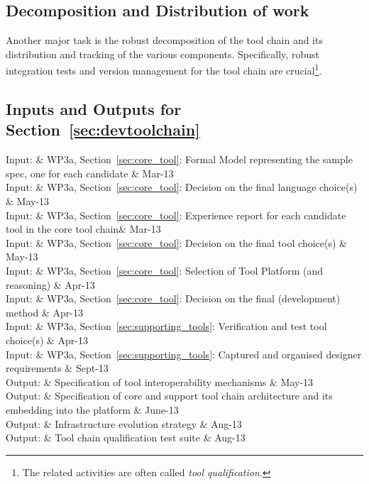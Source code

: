 \documentclass{template/openetcs_article}
\begin{document}
\subsection{Decomposition and Distribution of work}

Another major task is the robust decomposition of the tool chain and its 
distribution and tracking of the various components.  
Specifically, robust integration tests and version management for the tool chain are crucial\footnote{The related activities are often called {\it tool qualification}.}.



\subsection{Inputs and Outputs for Section~\ref{sec:devtoolchain}}


\begin{inoutput}
Input: & WP3a, Section~\ref{sec:core_tool}: Formal Model representing the sample
spec, one for each candidate  & Mar-13 \\
Input: & WP3a, Section~\ref{sec:core_tool}: Decision on the final language
choice(s) & May-13 \\
Input: & WP3a, Section~\ref{sec:core_tool}: Experience report for each candidate
tool in the core tool chain& Mar-13 \\
Input: & WP3a, Section~\ref{sec:core_tool}: Decision on the final tool choice(s)
& May-13 \\
Input: & WP3a, Section~\ref{sec:core_tool}: Selection of Tool Platform (and
reasoning)  & Apr-13 \\
Input: & WP3a, Section~\ref{sec:core_tool}: Decision on the final (development)
method  & Apr-13 \\
Input: & WP3a, Section~\ref{sec:supporting_tools}: Verification and test tool
choice(s)  & Apr-13 \\
Input: & WP3a, Section~\ref{sec:supporting_tools}: Captured and organised designer
requirements  & Sept-13 \\
\hline
Output: & Specification of tool interoperability mechanisms & May-13 \\
Output: & Specification of core and support tool chain architecture and its
embedding into the platform & June-13 \\
Output: & Infrastructure evolution strategy & Aug-13 \\
Output: & Tool chain qualification test suite & Aug-13 \\
\end{inoutput}
\end{document}
